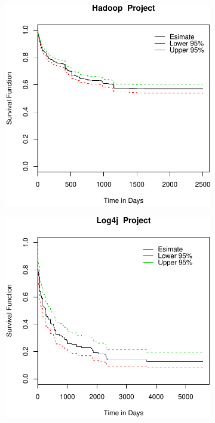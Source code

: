 \begin{figure}[t]
\begin{subfigure}[b]{0.195\textwidth}
		\label{fig:removal_comparison_tomcat_survival} 
	\end{subfigure}
	\begin{subfigure}[b]{0.195\textwidth}
		\includegraphics[width=\textwidth]{figures/Survival/hadoop.pdf}
		\label{fig:removal_comparison_gerrit_survival} 
	\end{subfigure}
	\begin{subfigure}[b]{0.195\textwidth}
		\includegraphics[width=\textwidth]{figures/Survival/log4j.pdf}

\end{subfigure}
\end{figure}
